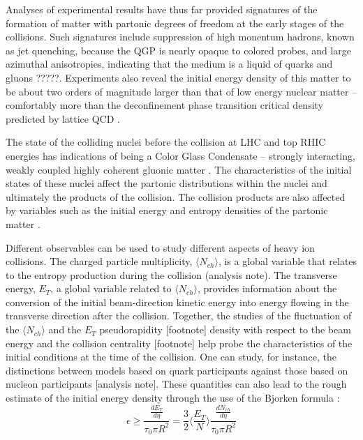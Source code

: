 Analyses of experimental results have thus far provided signatures of the formation of matter with partonic degrees of freedom at the early stages of the collisions. Such signatures include suppression of high monentum hadrons, known as jet quenching, because the QGP is nearly opaque to colored probes, and large azimuthal anisotropies, indicating that the medium is a liquid of quarks and gluons \cite{PhysRevC.96.044904}?????. Experiments also reveal the initial energy density of this matter to be about two orders of magnitude larger than that of low energy nuclear matter -- comfortably more than the deconfinement phase transition critical density predicted by lattice QCD \cite{2005PrPNP..54..443J}.

The state of the colliding nuclei before the collision at LHC and top RHIC energies has indications of being a Color Glass Condensate -- strongly interacting, weakly coupled highly coherent gluonic matter \cite{1742-6596-458-1-012024}. The characteristics of the initial states of these nuclei affect the partonic distributions within the nuclei and ultimately the products of the collision. The collision products are also affected by variables such as the initial energy and entropy densities of the partonic matter \cite{2005PrPNP..54..443J}.

Different observables can be used to study different aspects of heavy ion collisions. The charged particle multiplicity, $\langle N_{ch} \rangle$, is a global variable that relates to the entropy production during the collision (analysis note). The transverse energy, $E_{T}$, a global variable related to $\langle N_{ch} \rangle$, provides information about the conversion of the initial beam-direction kinetic energy into energy flowing in the transverse direction after the collision. Together, the studies of the fluctuation of the $\langle N_{ch} \rangle$ and the $E_{T}$ pseudorapidity [footnote] density with respect to the beam energy and the collision centrality [footnote] help probe the characteristics of the initial conditions at the time of the collision. One can study, for instance, the distinctions between models based on quark participants against those based on nucleon participants [analysis note]. These quantities can also lead to the rough estimate of the initial energy density through the use of the Bjorken formula \cite{2012ARNPS..62..361M}:
\begin{equation}\label{eqn:Bjorken}
\epsilon \geq \frac{\frac{dE_{T}}{d\eta}}{\tau_{0}\pi R^{2}} = \frac{3}{2}\langle \frac{E_{T}}{N} \rangle \frac{\frac{dN_{ch}}{d\eta}}{\tau_{0}\pi R^{2}}
\end{equation}

